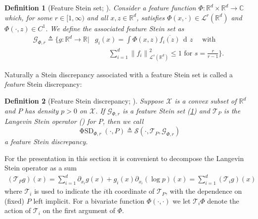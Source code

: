 \documentclass[12pt,paper=letter]{scrreprt}
\newtheorem{definition}{Definition}[chapter]
\newcommand{\dee}{\mathop{\mathrm{d}\!}}
\newcommand{\dz}{\,\dee z}
\newcommand{\qtext}[1]{\quad\text{#1}\quad}
\def\reals{\mathbb{R}} %
\def\R{\mathbb{R}}
\newcommand{\Rd}{{\R}^d}
\def\complex{\mathbb{C}} %
\def\defeq{\triangleq} %
\def\defined{\defeq} %
\def\norm#1{\left\|{#1}\right\|} %
\newcommand{\xset}[0]{\mathcal{X}} %
\newcommand{\gset}[0]{\mathcal{G}} %
\newcommand{\feat}{\Phi} %
\newcommand{\FSD}{\ensuremath{\operatorname{\mathrm{\Phi}SD}}\xspace}
\newcommand{\targetdist}{P}
\begin{document}
\begin{definition}[Feature Stein set; \citealp{huggins2018random}]\label{def:feature_set}
Consider a \emph{feature function} $\feat : \reals^d \times \reals^d \to \complex$ 
which,  for some $r \in [1,\infty)$ and all $x, z\in\reals^d$, satisfies $\feat(x,\cdot) \in \mathcal{L}^r(\mathbb{R}^d)$  and $\feat(\cdot, z) \in C^1$.
We define the associated \emph{feature Stein set} as
\begin{align*}
\gset_{\feat,r} 
	\defined \Bigg\{ g : \reals^{d} \to \reals \Bigg| &  g_i(x) = \int \feat(x,z) \overline{f_i(z)} \dz 
		\qtext{  with  } \\
		& \qquad \sum_{i=1}^d  \norm{f_i}_{\mathcal{L}^s(\mathbb{R}^d)}^2 \leq 1
		\text{ for }
		s = \frac{r}{r-1}
		\Bigg\}.
\end{align*}
\end{definition}

\noindent Naturally a Stein discrepancy associated with a feature Stein set is called a \emph{feature} Stein discrepancy:



\begin{definition}[Feature Stein discrepancy; \citealp{huggins2018random}]
\label{def: feature SD}
Suppose $\xset$ is a convex subset of $\Rd$ and 
$P$ has density $p > 0$ on $\xset$.
If $\gset_{\feat,r}$ is a feature Stein set (\cref{def:feature_set})
and 
$\mathcal{T}_P$ is the Langevin Stein operator () for $P$, then 
we call 
$$
\FSD_{\feat,r}(\cdot,\targetdist) \defined \mathcal{S}(\cdot,\mathcal{T}_P,\gset_{\feat,r})
$$ 
a \emph{feature Stein discrepancy}.
\end{definition}

For the presentation in this section it is convenient to decompose the Langevin Stein operator as a sum
\begin{align}
    (\mathcal{T}_P g)(x) = \sum_{i=1}^d \partial_{x_i} g(x) + g_i(x) \partial_{x_i} (\log p)(x) 
    = \sum_{i=1}^d (\mathcal{T}_i g)(x) \label{eq: Lang op as sum}
\end{align}
where $\mathcal{T}_i$ is used to indicate the $i$th coordinate of $\mathcal{T}_P$, with the dependence on (fixed) $P$ left implicit.
For a bivariate function $\Phi(\cdot,\cdot)$ we let $\mathcal{T}_i \Phi$ denote the action of $\mathcal{T}_i$ on the first argument of $\Phi$.
\end{document}
